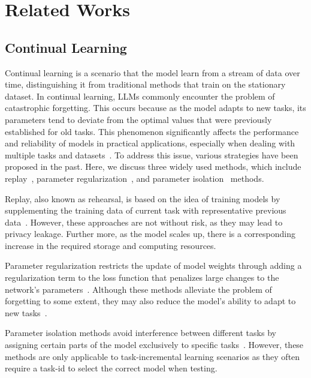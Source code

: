 \section{Related Works}
\label{sec2}
\subsection{Continual Learning}
Continual learning is a scenario that the model learn from a stream of data over time, distinguishing it from traditional methods that train on the stationary dataset.
In continual learning, LLMs commonly encounter the problem of catastrophic forgetting. This occurs because as the model adapts to new tasks, its parameters tend to deviate from the optimal values that were previously established for old tasks. This phenomenon significantly affects the performance and reliability of models in practical applications, especially when dealing with multiple tasks and datasets~\cite{ref12}. To address this issue, various strategies have been proposed in the past. Here, we discuss three widely used methods, which include replay~\cite{ref13,ref14}, parameter regularization~\cite{ref15,ref16,ref17}, and parameter isolation~\cite{ref18,ref19,ref20} methods.

Replay, also known as rehearsal, is based on the idea of training models by supplementing the training data of current task with representative previous data~\cite{ref14}. However, these approaches are not without risk, as they may lead to privacy leakage. Further more, as the model scales up, there is a corresponding increase in the required storage and computing resources. 

Parameter regularization restricts the update of model weights through adding a regularization term to the loss function that penalizes large changes to the network's parameters~\cite{ref16}. Although these methods alleviate the problem of forgetting to some extent, they may also reduce the model's ability to adapt to new tasks~\cite{ref17}. 

Parameter isolation methods avoid interference between different tasks by assigning certain parts of the model exclusively to specific tasks~\cite{ref20}. However, these methods are only applicable to task-incremental learning scenarios as they often require a task-id to select the correct model when testing.

